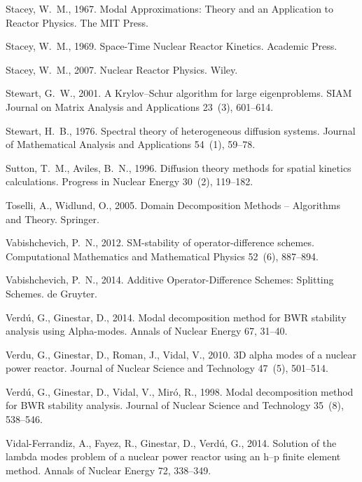 \documentclass[a4paper]{jpconf}
\begin{document}
\begin{thebibliography}{50}
Stacey, W.~M., 1967. Modal Approximations: Theory and an Application to Reactor
  Physics. The MIT Press.

Stacey, W.~M., 1969. Space-Time Nuclear Reactor Kinetics. Academic Press.

Stacey, W.~M., 2007. Nuclear Reactor Physics. Wiley.

Stewart, G.~W., 2001. A {Krylov--Schur} algorithm for large eigenproblems. SIAM
  Journal on Matrix Analysis and Applications 23~(3), 601--614.

Stewart, H.~B., 1976. Spectral theory of heterogeneous diffusion systems.
  Journal of Mathematical Analysis and Applications 54~(1), 59--78.

Sutton, T.~M., Aviles, B.~N., 1996. Diffusion theory methods for spatial
  kinetics calculations. Progress in Nuclear Energy 30~(2), 119--182.

Toselli, A., Widlund, O., 2005. Domain Decomposition Methods -- Algorithms and
  Theory. Springer.

Vabishchevich, P.~N., 2012. {SM}-stability of operator-difference schemes.
  Computational Mathematics and Mathematical Physics 52~(6), 887--894.

Vabishchevich, P.~N., 2014. {Additive Operator-Difference Schemes: Splitting
  Schemes}. de Gruyter.

Verd{\'u}, G., Ginestar, D., 2014. Modal decomposition method for {BWR}
  stability analysis using {A}lpha-modes. Annals of Nuclear Energy 67, 31--40.

Verdu, G., Ginestar, D., Roman, J., Vidal, V., 2010. {3D} alpha modes of a
  nuclear power reactor. Journal of Nuclear Science and Technology 47~(5),
  501--514.

Verd{\'u}, G., Ginestar, D., Vidal, V., Mir{\'o}, R., 1998. Modal decomposition
  method for {BWR} stability analysis. Journal of Nuclear Science and
  Technology 35~(8), 538--546.

Vidal-Ferrandiz, A., Fayez, R., Ginestar, D., Verd{\'u}, G., 2014. Solution of
  the lambda modes problem of a nuclear power reactor using an h--p finite
  element method. Annals of Nuclear Energy 72, 338--349.
  
\end{thebibliography}
\end{document}
